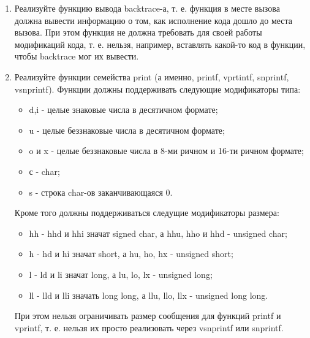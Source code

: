 \begin{enumerate}
  \item Реализуйте функцию вывода backtrace-а, т. е. функция в месте вызова
  должна вывести информацию о том, как исполнение кода дошло до места вызова.
  При этом функция не должна требовать для своей работы модификаций кода, т. е.
  нельзя, например, вставлять какой-то код в функции, чтобы backtrace мог их
  вывести.
  \item Реализуйте функции семейства print (а именно, printf, vprtintf,
  snprintf, vsnprintf). Функции должны поддерживать следующие модификаторы типа:
  \begin{itemize}
    \item d,i - целые знаковые числа в десятичном формате;
    \item u - целые беззнаковые числа в десятичном формате;
    \item o и x - целые беззнаковые числа в 8-ми ричном и 16-ти ричном формате;
    \item с - char;
    \item s - строка char-ов заканчивающаяся 0.
  \end{itemize}
  Кроме того должны поддерживаться следущие модификаторы размера:
  \begin{itemize}
    \item hh - hhd и hhi значат signed char, а hhu, hho и hhd - unsigned char;
    \item h - hd и hi значат short, а hu, ho, hx - unsigned short;
    \item l - ld и li значат long, а lu, lo, lx - unsigned long;
    \item ll - lld и lli значать long long, а llu, llo, llx - unsigned long
    long.
  \end{itemize}
  При этом нельзя ограничивать размер сообщения для функций printf и vprintf, т.
  е. нельзя их просто реализовать через vsnprintf или snprintf.
\end{enumerate}
